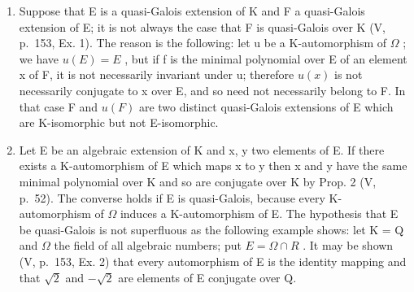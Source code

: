 \begin{enumerate}
\def\labelenumi{\arabic{enumi})}
\setcounter{enumi}{1}
\item
  Suppose that E is a quasi-Galois extension of K and F a quasi-Galois extension of E; it is not always the case that F is quasi-Galois over K (V, p.~153, Ex. 1). The reason is the following: let u be a K-automorphism of \(\Omega\) ; we have \(u(E) = E\) , but if f is the minimal polynomial over E of an element x of F, it is not necessarily invariant under u; therefore \(u(x)\) is not necessarily conjugate to x over E, and so need not necessarily belong to F. In that case F and \(u(F)\) are two distinct quasi-Galois extensions of E which are K-isomorphic but not E-isomorphic.
\item
  Let E be an algebraic extension of K and x, y two elements of E. If there exists a K-automorphism of E which maps x to y then x and y have the same minimal polynomial over K and so are conjugate over K by Prop. 2 (V, p.~52). The converse holds if E is quasi-Galois, because every K-automorphism of \(\Omega\) induces a K-automorphism of E. The hypothesis that E be quasi-Galois is not superfluous as the following example shows: let K = Q and \(\Omega\) the field of all algebraic numbers; put \(E = \Omega \cap R\) . It may be shown (V, p.~153, Ex. 2) that every automorphism of E is the identity mapping and that \(\sqrt{2}\) and \(-\sqrt{2}\) are elements of E conjugate over Q.
\end{enumerate}

